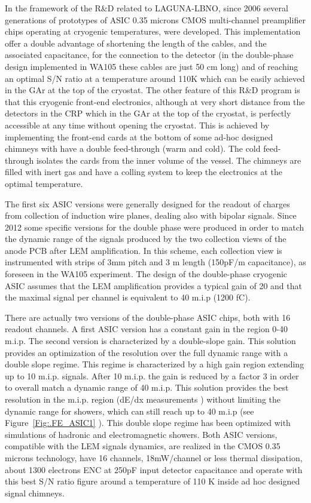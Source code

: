 In the framework of the R\&D related to LAGUNA-LBNO, since 2006 several generations of prototypes of ASIC 0.35 microns CMOS multi-channel preamplifier chips operating at cryogenic temperatures, were developed. This implementation offer a double advantage of shortening the length of the cables, and the associated capacitance, for the connection to the detector (in the double-phase design implemented in WA105 these cables are just 50 cm long) and of reaching an optimal S/N ratio at a temperature around 110K which can be easily achieved in the GAr at the top of the cryostat. The other feature of this R\&D program is that this cryogenic front-end electronics, although at very short distance from the detectors in the CRP which in the GAr at the top of the cryostat,  is perfectly accessible at any time without opening the cryostat. This is achieved by implementing the front-end cards at the bottom of some ad-hoc designed chimneys with have a double feed-through (warm and cold). The cold feed-through isolates the cards from the inner volume of the vessel. The chimneys are filled with inert gas and have a colling system to keep the electronics at the optimal temperature.

The first six ASIC versions were generally designed for the readout of charges from collection of induction wire planes, dealing also with bipolar signals. Since 2012 some specific versions for the double phase were produced in order to match the dynamic range of the signals produced by the two collection views of the anode PCB after LEM amplification. In this scheme, each collection  view is instrumented with strips of 3mm pitch and 3 m length (150pF/m capacitance), as foreseen in the WA105 experiment. The design of the double-phase cryogenic ASIC  assumes that the LEM amplification provides a typical gain of 20 and that the maximal signal per channel is equivalent to 40 m.i.p (1200 fC).

There are actually two versions of the double-phase ASIC chips, both with 16 readout channels. A first ASIC version has a constant gain in the region 0-40 m.i.p. The second version is characterized by a double-slope gain. This solution provides an optimization of the resolution over the full dynamic range with a double slope regime. This regime is characterized by a high gain region extending up to 10 m.i.p. signals. After 10 m.i.p. the gain is reduced by a factor 3 in order to overall match a dynamic range of 40 m.i.p. This solution provides the best resolution in the m.i.p. region (dE/dx measurements ) without limiting the dynamic range for showers, which can  still reach up to 40 m.i.p   (see  Figure~\ref{Fig:.FE_ASIC1} ). This double slope regime has been optimized with simulations of hadronic and electromagnetic showers. Both ASIC versions, compatible with the LEM signals dynamics,  are realized in the CMOS 0.35 microns technology,  have 16 channels, 18mW/channel or less thermal dissipation,  about 1300 electrons ENC at 250pF input detector capacitance and operate with this best S/N ratio figure around  a temperature of 110 K inside ad hoc designed signal chimneys.

